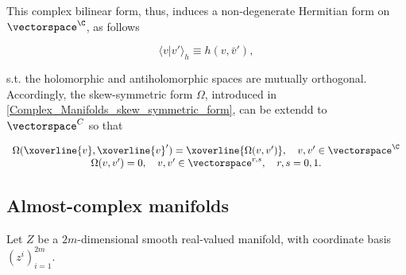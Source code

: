 \documentclass{homework}
\begin{document}
This complex bilinear form, thus, induces a non-degenerate Hermitian form on $\vectorspace^\C$, as follows 

$$
    \langle v | v' \rangle_{h} \equiv h(v, \bar{v}'), 
$$

s.t. the holomorphic and antiholomorphic spaces are mutually orthogonal. Accordingly, the skew-symmetric form $\Omega$, introduced in \cref{Complex_Manifolds_skew_symmetric_form}, can be extendd to $\vectorspace^C$ so that 

\begin{equation}
    \begin{array}{cc}
          \Omega(\xoverline{v}, \xoverline{v}') = \xoverline{\Omega(v,v')}, \quad v,v' \in \vectorspace^\C\\ 
          \Omega(v,v') = 0, \quad v,v' \in \vectorspace^{r,s},\quad r,s=0,1. 
    \end{array}
\end{equation}

\clearpage

\subsection{Almost-complex manifolds}

Let $Z$ be a $2m$-dimensional smooth real-valued manifold, with coordinate basis $(z^i)_{i=1}^{2m}.$




\end{document}
